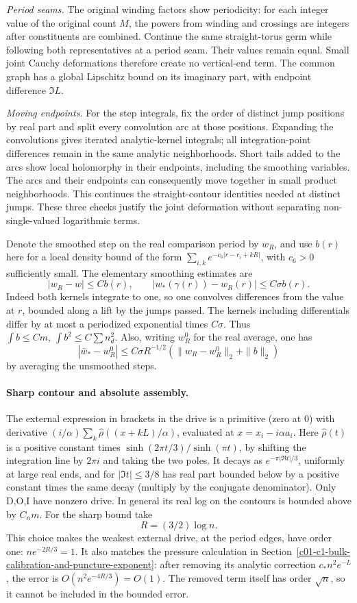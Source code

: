 \emph{Period seams.} The original winding factors show periodicity: for each integer value of the original count $M$, the powers from winding and crossings are integers after constituents are combined. Continue the same straight-torus germ while following both representatives at a period seam. Their values remain equal. Small joint Cauchy deformations therefore create no vertical-end term. The common graph has a global Lipschitz bound on its imaginary part, with endpoint difference $\Im L$.

\emph{Moving endpoints.} For the step integrals, fix the order of distinct jump positions by real part and split every convolution arc at those positions. Expanding the convolutions gives iterated analytic-kernel integrals; all integration-point differences remain in the same analytic neighborhoods. Short tails added to the arcs show local holomorphy in their endpoints, including the smoothing variables. The arcs and their endpoints can consequently move together in small product neighborhoods. This continues the straight-contour identities needed at distinct jumps. These three checks justify the joint deformation without separating non-single-valued logarithmic terms.

Denote the smoothed step on the real comparison period by \(w_R\), and use \(b(r)\) here for a local density bound of the form \(\sum_{i,k} e^{-c_6|r-r_i+kR|}\), with \(c_6>0\) sufficiently small. The elementary smoothing estimates are
\[
 |w_R-w|\le C b(r),\qquad |w_*(\gamma(r))-w_R(r)|\le C\sigma b(r).
\]
Indeed both kernels integrate to one, so one convolves differences from the value at \(r\), bounded along a lift by the jumps passed. The kernels including differentials differ by at most a periodized exponential times \(C\sigma\). Thus \(\int b\le C m,\ \int b^2\le C\sum n_d^2\). Also, writing \(w_R^0\) for the real average, one has
\[
 |\bar w_* - w_R^0|\le C\sigma R^{-1/2}(\|w_R-w_R^0\|_2+\|b\|_2)
\]
by averaging the unsmoothed steps.

\paragraph{Sharp contour and absolute assembly.}
The external expression in brackets in the drive is a primitive (zero at 0) with derivative \((i/\alpha)\sum_k\widehat\rho((x+kL)/\alpha)\), evaluated at \(x=x_i-i\alpha a_i\). Here
\(\widehat\rho(t)\) is a positive constant times \(\sinh(2\pi t/3)/\sinh(\pi t)\), by shifting the integration line by \(2\pi i\) and taking the two poles. It decays as \(e^{-\pi |\Re t|/3}\), uniformly at large real ends, and for \(|\Im t|\le3/8\) has real part bounded below by a positive constant times the same decay (multiply by the conjugate denominator). Only D,O,I have nonzero drive. In general its real log on the contours is bounded above by \(C_n m\). For the sharp bound take
\[
 R=(3/2)\log n.
\]
This choice makes the weakest external drive, at the period edges, have order one: \(n e^{-2R/3}=1\). It also matches the pressure calculation in Section~\ref{c01-c1-bulk-calibration-and-puncture-exponent}: after removing its analytic correction \(c_*n^2e^{-L}\), the error is \(O(n^2e^{-4R/3})=O(1)\). The removed term itself has order \(\sqrt n\), so it cannot be included in the bounded error.

